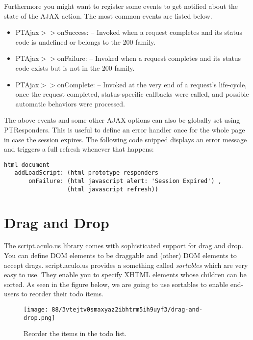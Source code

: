 \documentclass[a4paper,10pt,twoside]{book}
\newcommand{\ct}[1]{{\small\ttfamily\textup{#1}}}
\begin{document}
Furthermore you might want to register some events to get notified about the state of the AJAX action. The most common events are listed below.

\begin{itemize}
\item  \ct{PTAjax$>$$>$onSuccess:} -- Invoked when a request completes and its status code is undefined or belongs to the 200 family. 
\item  \ct{PTAjax$>$$>$onFailure:} -- Invoked when a request completes and its status code exists but is not in the 200 family. 
\item  \ct{PTAjax$>$$>$onComplete:} -- Invoked at the very end of a request's life-cycle, once the request completed, status-specific callbacks were called, and possible automatic behaviors were processed. 
\end{itemize}

The above events and some other AJAX options can also be globally set using  \ct{PTResponders}. This is useful to define an error handler once for the whole page in case the session expires. The following code snipped displays an error message and triggers a full refresh whenever that happens:

\begin{lstlisting}
html document
   addLoadScript: (html prototype responders
       onFailure: (html javascript alert: 'Session Expired') , 
                  (html javascript refresh))
\end{lstlisting}

\section{Drag and Drop}
\label{book:web20:scriptaculous:draganddrop}

The script.aculo.us library comes with sophisticated support for drag and drop. You can define DOM elements to be draggable and (other) DOM elements to accept drags. script.aculo.us provides a something called \textit{sortables} which are very easy to use. They enable you to specify XHTML elements whose children can be sorted. As seen in the figure below, we are going to use sortables to enable end-users to reorder their todo items.

\begin{figure}[h!tbp]
	\begin{center}
		\texttt{[image: 88/3vtejtv0smaxyaz2ibhtrm5ih9uyf3/drag-and-drop.png]}
		\caption{Reorder the items in the todo list.\label{book:web20:scriptaculous:draganddrop:draganddrop}}
	\end{center}
\end{figure}
\end{document}
